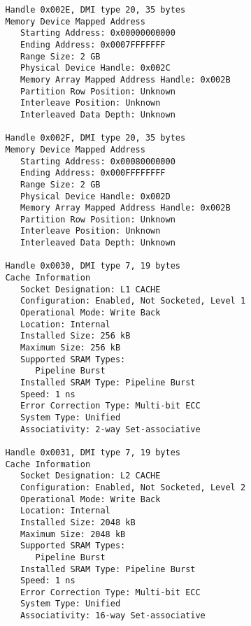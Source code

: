 \documentclass[11pt]{article}
\begin{document}
\begin{tiny}
\begin{verbatim}
         Handle 0x002E, DMI type 20, 35 bytes
         Memory Device Mapped Address
            Starting Address: 0x00000000000
            Ending Address: 0x0007FFFFFFF
            Range Size: 2 GB
            Physical Device Handle: 0x002C
            Memory Array Mapped Address Handle: 0x002B
            Partition Row Position: Unknown
            Interleave Position: Unknown
            Interleaved Data Depth: Unknown
         
         Handle 0x002F, DMI type 20, 35 bytes
         Memory Device Mapped Address
            Starting Address: 0x00080000000
            Ending Address: 0x000FFFFFFFF
            Range Size: 2 GB
            Physical Device Handle: 0x002D
            Memory Array Mapped Address Handle: 0x002B
            Partition Row Position: Unknown
            Interleave Position: Unknown
            Interleaved Data Depth: Unknown
         
         Handle 0x0030, DMI type 7, 19 bytes
         Cache Information
            Socket Designation: L1 CACHE
            Configuration: Enabled, Not Socketed, Level 1
            Operational Mode: Write Back
            Location: Internal
            Installed Size: 256 kB
            Maximum Size: 256 kB
            Supported SRAM Types:
               Pipeline Burst
            Installed SRAM Type: Pipeline Burst
            Speed: 1 ns
            Error Correction Type: Multi-bit ECC
            System Type: Unified
            Associativity: 2-way Set-associative
         
         Handle 0x0031, DMI type 7, 19 bytes
         Cache Information
            Socket Designation: L2 CACHE
            Configuration: Enabled, Not Socketed, Level 2
            Operational Mode: Write Back
            Location: Internal
            Installed Size: 2048 kB
            Maximum Size: 2048 kB
            Supported SRAM Types:
               Pipeline Burst
            Installed SRAM Type: Pipeline Burst
            Speed: 1 ns
            Error Correction Type: Multi-bit ECC
            System Type: Unified
            Associativity: 16-way Set-associative
         

\end{verbatim}
\end{tiny}
\end{document}
